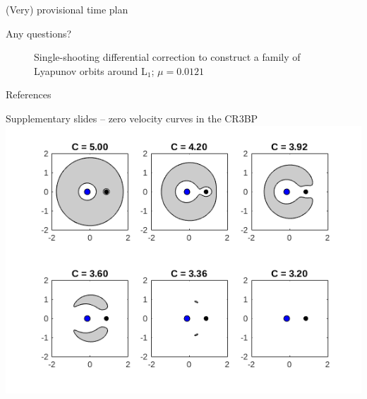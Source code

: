 \documentclass[10pt]{beamer}
\begin{document}
\begin{frame}{(Very) provisional time plan}
	\centering
\end{frame}

\begin{frame}{Any questions?}
	\begin{figure}
	\centering
		

	\caption{Single-shooting differential correction to construct a family of Lyapunov orbits around L$_1$; $\mu = 0.0121$}
	\end{figure}
\end{frame}

\begin{frame}{References}
	
	
\end{frame}

\appendix

\begin{frame}{Supplementary slides -- zero velocity curves in the CR3BP}	\centering
	\includegraphics[width=.8\linewidth]{../figures/jacobiConstantEMSys}
\end{frame}
\end{document}
